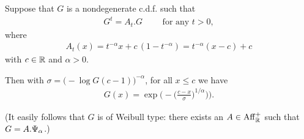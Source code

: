 \begin{lemma}
  \label{lem:characterization-self-similar-family-neg-index}
  \leanok
  Suppose that $G$ is a nondegenerate c.d.f. such that
  \begin{align*}
    G^{t} = A_t . G \qquad \text{ for any } t > 0 ,
  \end{align*}
  where
  \begin{align*}
    A_t(x) = t^{-\alpha} x + c \, (1 - t^{-\alpha}) = t^{-\alpha} (x-c) + c
  \end{align*}
  with $c \in \mathbb{R}$ and $\alpha > 0$.

  Then with $\sigma = \big(- \log G(c-1)\big)^{-\alpha}$,
  for all $x \le c$ we have
  \begin{align*}
    G(x) = \exp \Big( - \big( \frac{c - x}{\sigma} \big)^{1/\alpha} \big) \Big) .
  \end{align*}

  (It easily follows that $G$ is of Weibull type: there exists
  an $A \in \mathrm{Aff}^+_{\mathbb{R}}$ such that $G = A.\Psi_{\alpha}$.)
\end{lemma}
